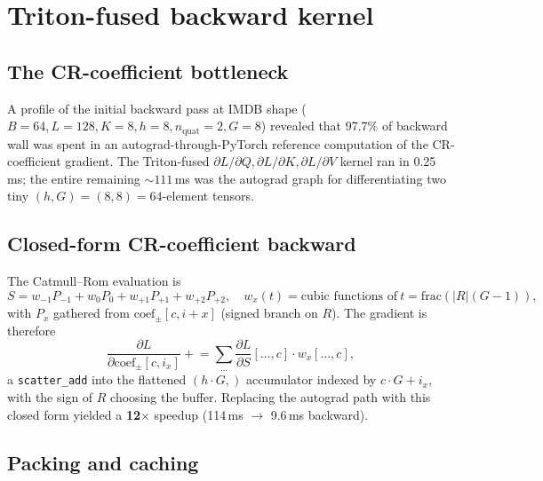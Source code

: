 \documentclass[10pt,a4paper]{article}
\begin{document}
\section{Triton-fused backward kernel}

\subsection{The CR-coefficient bottleneck}

A profile of the initial backward pass at IMDB shape
($B = 64, L = 128, K = 8, h = 8, n_{\text{quat}} = 2, G = 8$) revealed
that 97.7\% of backward wall was spent in an autograd-through-PyTorch
reference computation of the CR-coefficient gradient. The
Triton-fused $\partial L / \partial Q, \partial L / \partial K,
\partial L / \partial V$ kernel ran in 0.25\,ms; the entire remaining
$\sim 111\,$ms was the autograd graph for differentiating
two tiny $(h, G) = (8, 8) = 64$-element tensors.

\subsection{Closed-form CR-coefficient backward}

The Catmull--Rom evaluation is
\begin{equation}
S = w_{-1} P_{-1} + w_0 P_0 + w_{+1} P_{+1} + w_{+2} P_{+2},
\quad w_x(t) = \text{cubic functions of}\ t = \mathrm{frac}(|R|(G-1)),
\end{equation}
with $P_x$ gathered from $\mathrm{coef}_{\pm}[c, i + x]$ (signed branch
on $R$). The gradient is therefore
\begin{equation}
\frac{\partial L}{\partial \mathrm{coef}_{\pm}[c, i_x]}
  \mathrel{+}= \sum_{\ldots} \frac{\partial L}{\partial S}[\ldots, c]
                   \cdot w_x[\ldots, c],
\end{equation}
a \texttt{scatter\_add} into the flattened $(h \cdot G,)$ accumulator
indexed by $c \cdot G + i_x$, with the sign of $R$ choosing the buffer.
Replacing the autograd path with this closed form yielded a
\textbf{12$\times$} speedup (114\,ms $\to$ 9.6\,ms backward).

\subsection{Packing and caching}
\end{document}
